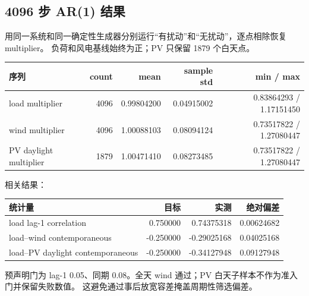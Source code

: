 \subsection{4096 步 AR(1) 结果}
用同一系统和同一确定性生成器分别运行“有扰动”和“无扰动”，逐点相除恢复 multiplier。
负荷和风电基线始终为正；PV 只保留 1879 个白天点。
\begin{center}\small
\begin{tabular}{@{}L{5.7cm}rrrr@{}}
\toprule
序列 & count & mean & sample std & min / max\\
\midrule
load multiplier & 4096 & 0.99804200 & 0.04915002 & 0.83864293 / 1.17151450\\
wind multiplier & 4096 & 1.00088103 & 0.08094124 & 0.73517822 / 1.27080447\\
PV daylight multiplier & 1879 & 1.00471410 & 0.08273485 & 0.73517822 / 1.27080447\\
\bottomrule
\end{tabular}
\end{center}

相关结果：
\begin{center}\small
\begin{tabular}{@{}L{6.8cm}rrr@{}}
\toprule
统计量 & 目标 & 实测 & 绝对偏差\\
\midrule
load lag-1 correlation & 0.750000 & 0.74375318 & 0.00624682\\
load--wind contemporaneous & -0.250000 & -0.29025168 & 0.04025168\\
load--PV daylight contemporaneous & -0.250000 & -0.34127948 & 0.09127948\\
\bottomrule
\end{tabular}
\end{center}
预声明门为 lag-1 0.05、同期 0.08。全天 wind 通过；PV 白天子样本不作为准入门并保留失败数值。
这避免通过事后放宽容差掩盖周期性筛选偏差。

